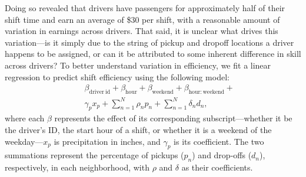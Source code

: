\documentclass[twocolumn]{article}
\begin{document}
Doing so revealed that drivers have passengers for approximately half of their shift time and earn an average of \$30 per shift, with a reasonable amount of variation in earnings across drivers.
That said, it is unclear what drives this variation---is it simply due to the string of pickup and dropoff locations a driver happens to be assigned, or can it be attributed to some inherent difference in skill across drivers?
To better understand variation in efficiency, we fit a linear regression to predict shift efficiency using the following model:
\begin{eqnarray*}
&& \beta_{\mathrm{driver~id}} + \beta_{\mathrm{hour}} + \beta_{\mathrm{weekend}} + \beta_{\mathrm{hour:weekend}} + \\
  & & \gamma_p x_p + \sum_{n=1}^N \rho_n p_n + \sum_{n=1}^N \delta_n d_n,
\end{eqnarray*}
where each $\beta$ represents the effect of its corresponding subscript---whether it be the driver's ID, the start hour of a shift, or whether it is a weekend of the weekday---$x_p$ is precipitation in inches, and  $\gamma_p$ is its coefficient. The two summations represent the percentage of pickups ($p_n$) and drop-offs ($d_n$), respectively, in each neighborhood, with $\rho$ and $\delta$ as their coefficients.
\end{document}

